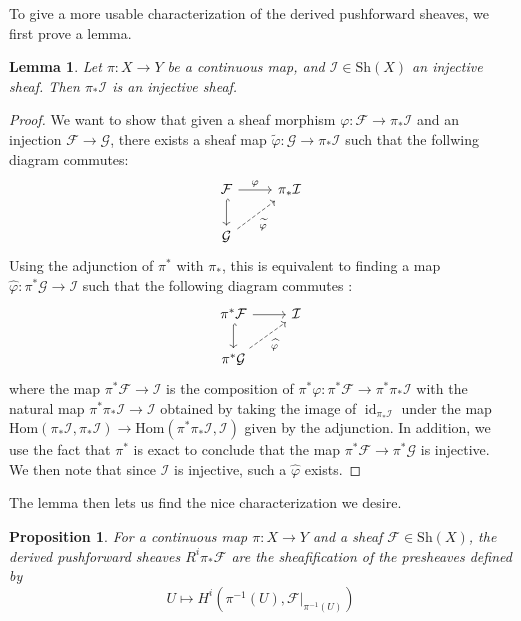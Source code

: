 \documentclass[psamsfonts, 12pt]{amsart}
\newtheorem{prop}[thm]{Proposition}
\newtheorem{lem}[thm]{Lemma}
\theoremstyle{definition}
\theoremstyle{remark}
\renewcommand{\hom}{\mathrm{Hom}}
\newcommand{\inv}{^{-1}}
\DeclareMathOperator{\id}{id}
\begin{document}
To give a more usable characterization of the derived pushforward sheaves,
we first prove a lemma.
%
\begin{lem}
Let $\pi : X \to Y$ be a continuous map, and $\mathcal{I} \in \mathrm{Sh}(X)$
an injective sheaf. Then $\pi_*\mathcal{I}$ is an injective sheaf.
\end{lem}
%
\begin{proof}
We want to show that given a sheaf morphism
$\varphi : \mathcal{F} \to \pi_*\mathcal{I}$ and an injection
$\mathcal{F} \to \mathcal{G}$, there exists a sheaf map
$\widetilde{\varphi} : \mathcal{G} \to \pi_*\mathcal{I}$ such that the follwing
diagram commutes:
\[\begin{tikzcd}
\mathcal{F} \ar[r, "\varphi"] \ar[d, hookrightarrow] & \pi_*\mathcal{I}  \\
\mathcal{G} \ar[ur, "\widetilde{\varphi}"',dashed]
\end{tikzcd}\]
Using the adjunction of $\pi^*$ with $\pi_*$, this is equivalent to finding
a map $\widehat{\varphi} : \pi^*\mathcal{G} \to \mathcal{I}$ such that
the following diagram commutes :
\[\begin{tikzcd}
\pi^*\mathcal{F} \ar[d, hookrightarrow]\ar[r] & \mathcal{I} \\
\pi^*\mathcal{G} \ar[ur, "\widehat{\varphi}"',dashed]
\end{tikzcd}\]
where the map $\pi^*\mathcal{F} \to \mathcal{I}$ is the composition of
$\pi^*\varphi : \pi^*\mathcal{F} \to \pi^*\pi_*\mathcal{I}$ with the
natural map $\pi^*\pi_*\mathcal{I} \to \mathcal{I}$ obtained by taking the image of
$\id_{\pi_*\mathcal{I}}$ under the map
$\hom(\pi_*\mathcal{I},\pi_*\mathcal{I}) \to \hom(\pi^*\pi_*\mathcal{I},\mathcal{I})$
given by the adjunction. In addition, we use the fact that $\pi^*$ is exact to
conclude that the map $\pi^*\mathcal{F} \to \pi^*\mathcal{G}$ is injective. We
then note that since $\mathcal{I}$ is injective, such a $\widehat{\varphi}$ exists.
\end{proof}
%
The lemma then lets us find the nice characterization we desire.
%
\begin{prop}
For a continuous map $\pi : X \to Y$ and a sheaf $\mathcal{F} \in \mathrm{Sh}(X)$,
the derived pushforward sheaves $R^i\pi_*\mathcal{F}$ are the sheafification
of the presheaves defined by
\[
U \mapsto H^i(\pi\inv(U), \mathcal{F}\vert_{\pi\inv(U)})
\]
\end{prop}
%
\end{document}
